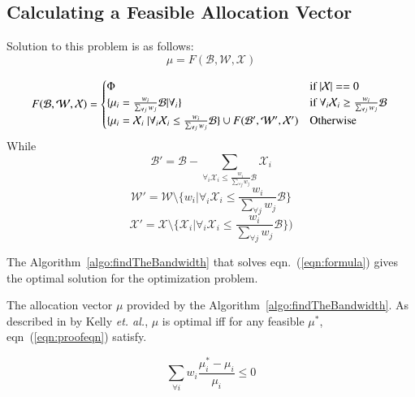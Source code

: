 \subsection{Calculating a Feasible Allocation Vector}
Solution to this problem is as follows: $$\mu = F(\mathcal{B}, \mathcal{W}, \mathcal{X})$$

\begin{equation}
\label{eqn:formula}
F(\mathcal{B}, \mathcal{W}, \mathcal{X}) = 
\begin{cases}
\Phi & \text{if } |\mathcal{X}| == 0 \\ 

\{\mu_i = \frac{w_i}{\sum_{\forall j}w_j} \mathcal{B} | \forall_i\} 
& \text{if } \forall_i \mathcal{X}_i \ge \frac{w_i}{\sum_{\forall j}w_j} \mathcal{B} \\

\{\mu_i = \mathcal{X}_i\ | \forall_i \mathcal{X}_i \le \frac{w_i}{\sum_{\forall j}w_j} \mathcal{B} \} \cup F(\mathcal{B}', \mathcal{W}', \mathcal{X}') 
	& \text{Otherwise}
\end{cases} \\
\end{equation}
While 
$$\mathcal{B}' = \mathcal{B} - \sum_{\forall_i \mathcal{X}_i \le \frac{w_i}{\sum_{\forall j}w_j} \mathcal{B}} \mathcal{X}_i$$
$$\mathcal{W}' = \mathcal{W} \setminus \{w_i | \forall_i \mathcal{X}_i \le \frac{w_i}{\sum_{\forall j}w_j} \mathcal{B} \}$$
$$\mathcal{X}' = \mathcal{X} \setminus \{\mathcal{X}_i | \forall_i \mathcal{X}_i \le \frac{w_i}{\sum_{\forall j}w_j} \mathcal{B}\})$$


\begin{theorem}
	The Algorithm~\ref{algo:findTheBandwidth} that solves eqn.~(\ref{eqn:formula}) gives the optimal solution for the optimization problem.
\end{theorem}

The allocation vector $\mu$ provided by the Algorithm~\ref{algo:findTheBandwidth}. As described in \cite{Kelly1998} by Kelly {\it et. al.}, $\mu$ is optimal iff for any feasible $\mu^*$, eqn~(\ref{eqn:proofeqn}) satisfy.

\begin{equation}
\label{eqn:proofeqn}
\sum_{\forall i} w_i \frac{\mu_i^* - \mu_i}{\mu_i} \le 0
\end{equation}


